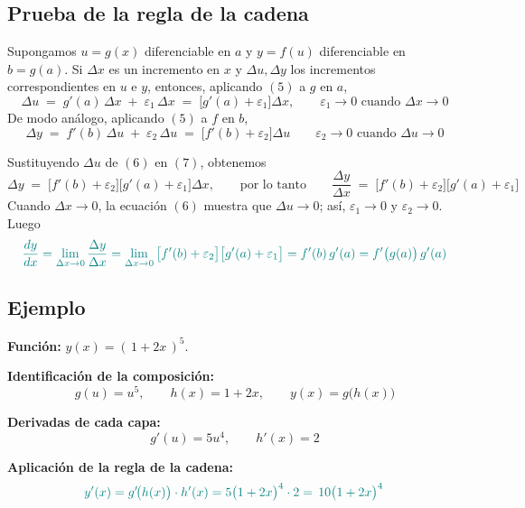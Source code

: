 \documentclass{article}
\begin{document}
\subsection*{Prueba de la regla de la cadena}
Supongamos \(u=g(x)\) diferenciable en \(a\) y \(y=f(u)\) diferenciable en \(b=g(a)\).
Si \(\Delta x\) es un incremento en \(x\) y \(\Delta u, \Delta y\) los incrementos correspondientes en \(u\) e \(y\),
entonces, aplicando \((5)\) a \(g\) en \(a\),
\begin{equation}
\Delta u \;=\; g'(a)\,\Delta x \;+\; \varepsilon_1\,\Delta x
\;=\; \big[g'(a)+\varepsilon_1\big]\Delta x,
\qquad
\varepsilon_1\to 0 \text{ cuando } \Delta x\to 0
\tag{6}
\end{equation}
De modo análogo, aplicando \((5)\) a \(f\) en \(b\),
\begin{equation}
\Delta y \;=\; f'(b)\,\Delta u \;+\; \varepsilon_2\,\Delta u
\;=\; \big[f'(b)+\varepsilon_2\big]\Delta u
\qquad
\varepsilon_2\to 0 \text{ cuando } \Delta u\to 0
\tag{7}
\end{equation}

Sustituyendo \(\Delta u\) de \((6)\) en \((7)\), obtenemos
\[
\Delta y \;=\; \big[f'(b)+\varepsilon_2\big]\big[g'(a)+\varepsilon_1\big]\Delta x,
\qquad\text{por lo tanto}\qquad
\frac{\Delta y}{\Delta x} \;=\; \big[f'(b)+\varepsilon_2\big]\big[g'(a)+\varepsilon_1\big]
\]
Cuando \(\Delta x\to 0\), la ecuación \((6)\) muestra que \(\Delta u\to 0\); así, \(\varepsilon_1\to 0\) y \(\varepsilon_2\to 0\).
Luego
\[ \color{teal}
\frac{dy}{dx}
=\lim_{\Delta x\to 0}\frac{\Delta y}{\Delta x}
=\lim_{\Delta x\to 0}\big[f'(b)+\varepsilon_2\big]\big[g'(a)+\varepsilon_1\big]
=f'(b)\,g'(a)
=f'\big(g(a)\big)\,g'(a)
\]

\subsection*{Ejemplo}



\textbf{Función:} \(\displaystyle y(x) = (\,1+2x\,)^5\).

\textbf{Identificación de la composición:}
\[
g(u)=u^{5}, \qquad h(x)=1+2x, \qquad y(x)=g\!\big(h(x)\big)
\]

\textbf{Derivadas de cada capa:}
\[
g'(u)=5u^{4}, \qquad h'(x)=2
\]

\textbf{Aplicación de la regla de la cadena:}
\[\color{teal}
y'(x)=g'\!\big(h(x)\big)\cdot h'(x)
=5\big(1+2x\big)^{4}\cdot 2
={\,10\big(1+2x\big)^{4}\,}
\]
\end{document}

